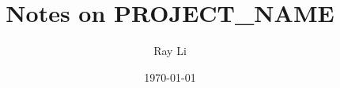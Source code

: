 \documentclass[12pt]{article}
\begin{document}
\title{Notes on PROJECT_NAME}
\author{Ray Li}
\date{\today}
\maketitle

\tableofcontents





\end{document}
